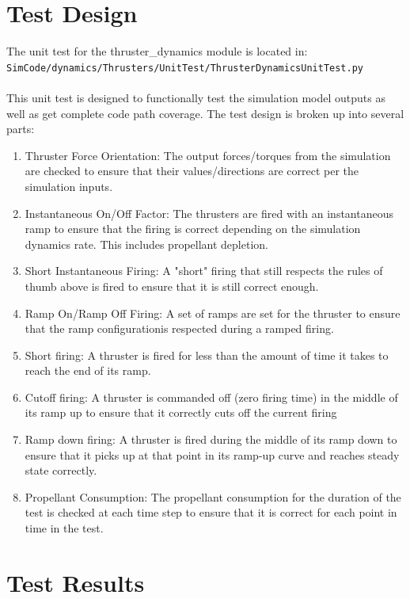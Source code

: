 \documentclass[]{LASPreport}
\begin{document}
\section{Test Design}
The unit test for the thruster\_dynamics module is located in:\\

\noindent
{\tt SimCode/dynamics/Thrusters/UnitTest/ThrusterDynamicsUnitTest.py} \\
\\

\noindent This unit test is designed to functionally test the simulation model 
outputs as well as get complete code path coverage.  The test design is broken 
up into several parts:\\
\begin{enumerate}
\item{Thruster Force Orientation: The output forces/torques from the simulation 
  are checked to ensure that their values/directions are correct per the 
  simulation inputs.}
\item{Instantaneous On/Off Factor: The thrusters are fired with an 
  instantaneous ramp to ensure that the firing is correct depending on the 
  simulation dynamics rate.  This includes propellant depletion.}
\item{Short Instantaneous Firing: A "short" firing that still respects the 
  rules of thumb above is fired to ensure that it is still correct enough.}
\item{Ramp On/Ramp Off Firing: A set of ramps are set for the thruster to ensure 
  that the ramp configurationis respected during a ramped firing.}
\item{Short firing: A thruster is fired for less than the amount of time it 
   takes to reach the end of its ramp.}
\item{Cutoff firing: A thruster is commanded off (zero firing time) in the middle 
   of its ramp up to ensure that it correctly cuts off the current firing}
\item{Ramp down firing: A thruster is fired during the middle of its ramp down 
   to ensure that it picks up at that point in its ramp-up curve and reaches 
   steady state correctly.}
\item{Propellant Consumption: The propellant consumption for the duration of the 
    test is checked at each time step to ensure that it is correct for each 
    point in time in the test.}
\end{enumerate}


\section{Test Results}
\end{document}
